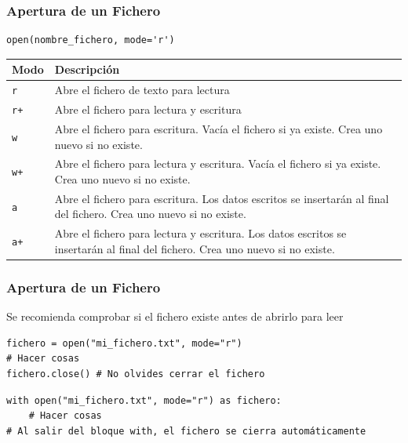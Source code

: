 \documentclass[11pt]{beamer}
\begin{document}
\begin{frame}[fragile]\frametitle{Apertura de un Fichero}
\begin{lstlisting}[basicstyle=\small]
open(nombre_fichero, mode='r')
\end{lstlisting}
\small
\begin{tabularx}{\textwidth}{lX}
\toprule
\textbf{Modo} & \textbf{Descripción} \\
\midrule
\texttt{r}    & Abre el fichero de texto para lectura \\
\texttt{r+}   & Abre el fichero para lectura y escritura \\
\texttt{w}    & Abre el fichero para escritura. Vacía el fichero si ya existe. Crea uno nuevo si no existe. \\
\texttt{w+}   & Abre el fichero para lectura y escritura. Vacía el fichero si ya existe. Crea uno nuevo si no existe. \\
\texttt{a}    & Abre el fichero para escritura. Los datos escritos se insertarán al final del fichero. Crea uno nuevo si no existe. \\
\texttt{a+}   & Abre el fichero para lectura y escritura. Los datos escritos se insertarán al final del fichero. Crea uno nuevo si no existe. \\
\bottomrule
\end{tabularx}
\end{frame}


\begin{frame}[fragile]\frametitle{Apertura de un Fichero}
\begin{block}{}
\centering Se recomienda comprobar si el fichero existe antes de abrirlo para leer
\end{block}
\begin{lstlisting}[basicstyle=\small]
fichero = open("mi_fichero.txt", mode="r")
# Hacer cosas
fichero.close() # No olvides cerrar el fichero
\end{lstlisting}
\begin{lstlisting}[basicstyle=\small]
with open("mi_fichero.txt", mode="r") as fichero:
    # Hacer cosas
# Al salir del bloque with, el fichero se cierra automáticamente
\end{lstlisting}
\end{frame}
\end{document}
